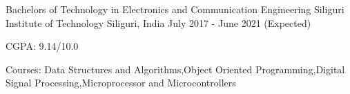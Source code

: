\begin{cventries}
  \cventry
    {Bachelors of Technology in Electronics and Communication Engineering}
    {Siliguri Institute of Technology}
    {Siliguri, India}
    {July 2017 - June 2021 (Expected)}
    {
      \begin{cvitems}
        \item {CGPA: 9.14/10.0}
        \item {Courses: Data Structures and Algorithms,Object Oriented Programming,Digital Signal Processing,Microprocessor and Microcontrollers}
      \end{cvitems}
    }
     \cventry
    \vspace{-6mm}

\end{cventries}
